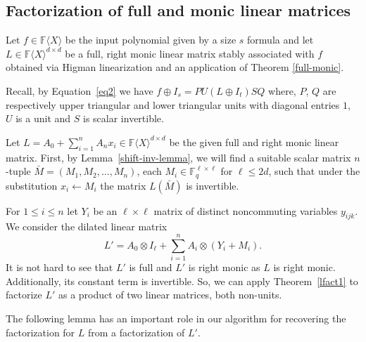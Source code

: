 \documentclass[10pt,a4paper]{article}
\newcommand{\F}{\mathbb{F}}
\renewcommand{\angle}[1]{\langle #1 \rangle}
\newcommand{\FX}{\F\angle{X}}
\newcommand{\fR}{\FX}
\begin{document}
\subsection{Factorization of full and monic linear matrices}

Let $f\in \fR$ be the input polynomial given by a size $s$ formula and
let $L \in\fR^{d\times d}$ be a full, right monic linear matrix stably
associated with $f$ obtained via Higman linearization and an
application of Theorem \ref{full-monic}.

Recall, by Equation~\ref{eq2} we have $f \oplus I_s= PU(L \oplus
I_t)SQ$ where, $P$, $Q$ are respectively upper triangular and lower
triangular units with diagonal entries $1$, $U$ is a unit and $S$ is
scalar invertible. 

%
%
%
%
%
%

Let $L=A_0+\sum_{i=1}^n A_n x_i\in\fR^{d\times d}$ be the given full
and right monic linear matrix.  First, by Lemma~\ref{shift-inv-lemma},
we will find a suitable scalar matrix $n$-tuple
$\bar{M}=(M_1,M_2,\ldots,M_n)$, each $M_i\in \F_q^{\ell\times \ell}$
for $\ell\le 2d$, such that under the substitution $x_i\leftarrow M_i$
the matrix $L(\bar{M})$ is invertible.

For $1\le i\le n$ let $Y_i$ be an $\ell\times \ell$ matrix of distinct
noncommuting variables $y_{ijk}$. We consider the dilated linear
matrix
\begin{equation}\label{dilate-eq1}
L' = A_0\otimes I_\ell + \sum_{i=1}^n A_i\otimes (Y_i+M_i).
\end{equation}
It is not hard to see that $L'$ is full and $L'$ is right monic as  $L$ is right monic. Additionally, its constant term is 
invertible. So, we can apply Theorem~\ref{lfact1} to factorize $L'$ as
a product of two linear matrices, both non-units.

The following lemma \cite{HKV20} has an important role in our
algorithm for recovering the factorization for $L$ from a
factorization of $L'$.
\end{document}
